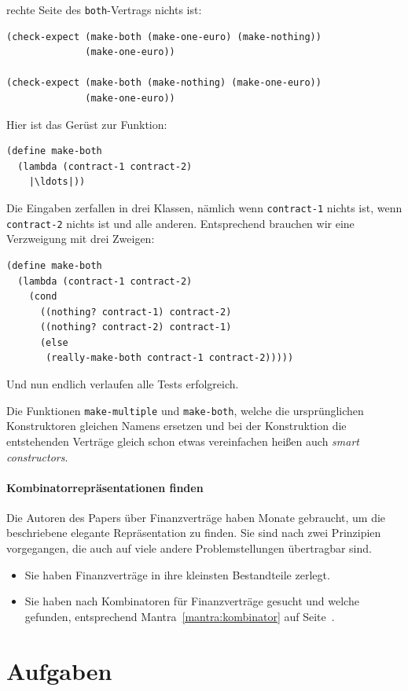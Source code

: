 rechte Seite des \lstinline{both}-Vertrags nichts ist:
%
\begin{lstlisting}
(check-expect (make-both (make-one-euro) (make-nothing))
              (make-one-euro))

(check-expect (make-both (make-nothing) (make-one-euro)) 
              (make-one-euro))
\end{lstlisting}
%
Hier ist das Gerüst zur Funktion:
%
\begin{lstlisting}
(define make-both
  (lambda (contract-1 contract-2)
    |\ldots|))
\end{lstlisting}
%
Die Eingaben zerfallen in drei Klassen, nämlich wenn
\lstinline{contract-1} nichts ist, wenn \lstinline{contract-2} nichts
ist und alle anderen.  Entsprechend brauchen wir eine Verzweigung mit
drei Zweigen:
%
\begin{lstlisting}
(define make-both
  (lambda (contract-1 contract-2)
    (cond
      ((nothing? contract-1) contract-2)
      ((nothing? contract-2) contract-1)
      (else
       (really-make-both contract-1 contract-2)))))
\end{lstlisting}
%
Und nun endlich verlaufen alle Tests erfolgreich.

Die Funktionen \lstinline{make-multiple} und \lstinline{make-both},
welche die ursprünglichen Konstruktoren gleichen Namens ersetzen und
bei der Konstruktion die entstehenden Verträge gleich schon etwas
vereinfachen heißen auch \textit{smart constructors}.

\paragraph{Kombinatorrepräsentationen finden} Die Autoren des Papers über Finanzverträge
haben Monate gebraucht, um die beschriebene elegante Repräsentation zu
finden.  Sie sind nach zwei Prinzipien vorgegangen, die auch auf viele andere Problemstellungen übertragbar sind.

%
\begin{itemize}
\item Sie haben Finanzverträge in ihre kleinsten Bestandteile zerlegt.
\item Sie haben nach Kombinatoren für Finanzverträge gesucht und
  welche gefunden, entsprechend Mantra~\ref{mantra:kombinator} auf Seite~\pageref{mantra:kombinator}.
\end{itemize}
%

\section*{Aufgaben}

